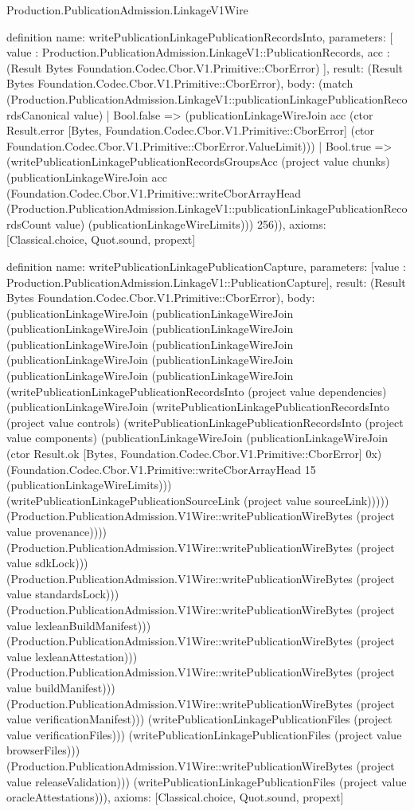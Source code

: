 \begin{lexlean}{Production.PublicationAdmission.LinkageV1Wire}
\begin{semanticmodule}
definition{
  name: writePublicationLinkagePublicationRecordsInto,
  parameters: [
    value : Production.PublicationAdmission.LinkageV1::PublicationRecords,
    acc : (Result Bytes Foundation.Codec.Cbor.V1.Primitive::CborError)
  ],
  result: (Result Bytes Foundation.Codec.Cbor.V1.Primitive::CborError),
  body: (match (Production.PublicationAdmission.LinkageV1::publicationLinkagePublicationRecordsCanonical value)
    | Bool.false => (publicationLinkageWireJoin acc (ctor Result.error [Bytes, Foundation.Codec.Cbor.V1.Primitive::CborError] (ctor Foundation.Codec.Cbor.V1.Primitive::CborError.ValueLimit)))
    | Bool.true => (writePublicationLinkagePublicationRecordsGroupsAcc (project value chunks) (publicationLinkageWireJoin acc (Foundation.Codec.Cbor.V1.Primitive::writeCborArrayHead (Production.PublicationAdmission.LinkageV1::publicationLinkagePublicationRecordsCount value) (publicationLinkageWireLimits))) 256)),
  axioms: [Classical.choice, Quot.sound, propext]
}

definition{
  name: writePublicationLinkagePublicationCapture,
  parameters: [value : Production.PublicationAdmission.LinkageV1::PublicationCapture],
  result: (Result Bytes Foundation.Codec.Cbor.V1.Primitive::CborError),
  body: (publicationLinkageWireJoin (publicationLinkageWireJoin (publicationLinkageWireJoin (publicationLinkageWireJoin (publicationLinkageWireJoin (publicationLinkageWireJoin (publicationLinkageWireJoin (publicationLinkageWireJoin (publicationLinkageWireJoin (publicationLinkageWireJoin (writePublicationLinkagePublicationRecordsInto (project value dependencies) (publicationLinkageWireJoin (writePublicationLinkagePublicationRecordsInto (project value controls) (writePublicationLinkagePublicationRecordsInto (project value components) (publicationLinkageWireJoin (publicationLinkageWireJoin (ctor Result.ok [Bytes, Foundation.Codec.Cbor.V1.Primitive::CborError] 0x) (Foundation.Codec.Cbor.V1.Primitive::writeCborArrayHead 15 (publicationLinkageWireLimits))) (writePublicationLinkagePublicationSourceLink (project value sourceLink))))) (Production.PublicationAdmission.V1Wire::writePublicationWireBytes (project value provenance)))) (Production.PublicationAdmission.V1Wire::writePublicationWireBytes (project value sdkLock))) (Production.PublicationAdmission.V1Wire::writePublicationWireBytes (project value standardsLock))) (Production.PublicationAdmission.V1Wire::writePublicationWireBytes (project value lexleanBuildManifest))) (Production.PublicationAdmission.V1Wire::writePublicationWireBytes (project value lexleanAttestation))) (Production.PublicationAdmission.V1Wire::writePublicationWireBytes (project value buildManifest))) (Production.PublicationAdmission.V1Wire::writePublicationWireBytes (project value verificationManifest))) (writePublicationLinkagePublicationFiles (project value verificationFiles))) (writePublicationLinkagePublicationFiles (project value browserFiles))) (Production.PublicationAdmission.V1Wire::writePublicationWireBytes (project value releaseValidation))) (writePublicationLinkagePublicationFiles (project value oracleAttestations))),
  axioms: [Classical.choice, Quot.sound, propext]
}


\end{semanticmodule}
\end{lexlean}
